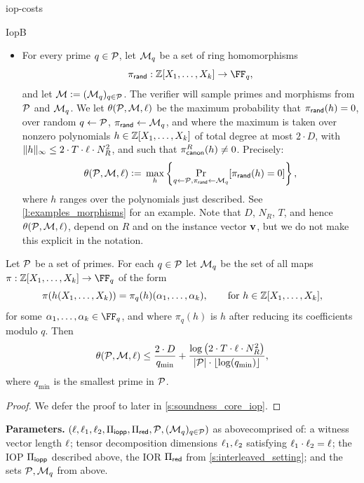 \begin{lncsappendix}{iop-costs}
\begin{lncsmove}{IopB}
\begin{itemize}[leftmargin=*]
\iflncs\else\item\fi{} For every prime $q\in \mathcal{P}$, let $\mathcal{M}_q$ be a set of ring homomorphisms $$\pirand:\ZZ[X_1,\ldots, X_{k}] \to \FF_q,$$ and let $\mathcal{M}{\;\vcentcolon=\;} (\mathcal{M}_q)_{q\in \mathcal{P}}$. The verifier will sample primes and morphisms from $\mathcal{P}$ and $\mathcal{M}_q$. We let $\theta(\mathcal{P},\mathcal{M},\ell)$ be the maximum probability that $\pi_{\mathsf{rand}}(h)=0$, over random $q\gets \mathcal{P}$, $\pi_{\mathsf{rand}}\gets \mathcal{M}_q$, and where the maximum is taken over nonzero polynomials $h\in \mathbb{Z}[X_1, \ldots, X_{k}]$ of total degree at most $2\cdot D$, with $\lVert h\rVert_{\infty} \leq 2\cdot T\cdot \ell\cdot N_R^2$, and such that $\pi_{\mathsf{canon}}^{R}(h)\neq 0$. Precisely:
%
\begin{equation}\label{e:theta_def}
\theta(\mathcal{P},\mathcal{M},\ell) {\;\vcentcolon=\;}  \max_{h}\left\{\Pr_{q\gets \mathcal{P}, \pi_{\mathsf{rand}}\gets \mathcal{M}_q}[ \pi_{\mathsf{rand}}(h)=0] \right\},
\end{equation}
%
where $h$ ranges over the polynomials just described. See \cref{l:examples_morphisms} for an example. Note that $D$, $N_R$, $T$, and hence $\theta(\mathcal{P},\mathcal{M},\ell)$, depend on $R$ and on the instance vector $\mathbf{v}$, but we do not make this explicit in the notation.
\iflncs\else\end{itemize}\fi


\begin{lemma}\label{l:examples_morphisms}
    Let $\mathcal{P}$ be a set of primes. For each $q\in \mathcal{P}$ let $\mathcal{M}_q$  be the set of all maps $\pi: \ZZ[X_1,\ldots, X_{k}]\to \FF_q$ of the form
     $$\pi(h(X_1, \ldots, X_{k})) = \pi_q(h)(\alpha_1, \ldots, \alpha_{k}), \qquad \text{for } h\in \mathbb{Z}[X_1,\ldots, X_{k}],$$
%
for some $\alpha_1,\ldots, \alpha_{k}\in \FF_q$, and where $\pi_q(h)$ is $h$ after reducing its coefficients modulo $q$. Then
         $$
    \theta(\mathcal{P},\mathcal{M},\ell) \leq \frac{2\cdot D}{q_{\min}} + \frac{\log\left(2\cdot T\cdot \ell\cdot N_R^2\right)}{|\mathcal{P}|\cdot \lfloor\log(q_{\min})\rfloor},
    $$
    where $q_{\min}$ is the smallest prime in $\mathcal{P}$.
\end{lemma}
\begin{proof}
    We defer the proof to later in \cref{s:soundness_core_iop}.
\end{proof}


\renewcommand{\degevalfield}{\deg(\evalfield)}




\begin{construction}\label{c:core_iop}
\noindent \textbf{Parameters.} $(\ell, \ell_1,\ell_2, \Pi_{\mathsf{iopp}}, \Pi_{\mathsf{red}}, \mathcal{P}, (\mathcal{M}_q)_{q\in \mathcal{P}})$ \iflncs as above\else comprised of: a witness vector length $\ell$; tensor decomposition dimensions $\ell_1, \ell_2$  satisfying $\ell_1\cdot \ell_2 = \ell$; the IOP $\Pi_{\mathsf{iopp}}$ described above, the IOR $\Pi_{\mathsf{red}}$ from \cref{s:interleaved_setting}; and the sets $\mathcal{P}, \mathcal{M}_q$ from above. \fi
\\


\end{construction}
\end{lncsmove}
\end{lncsappendix}
